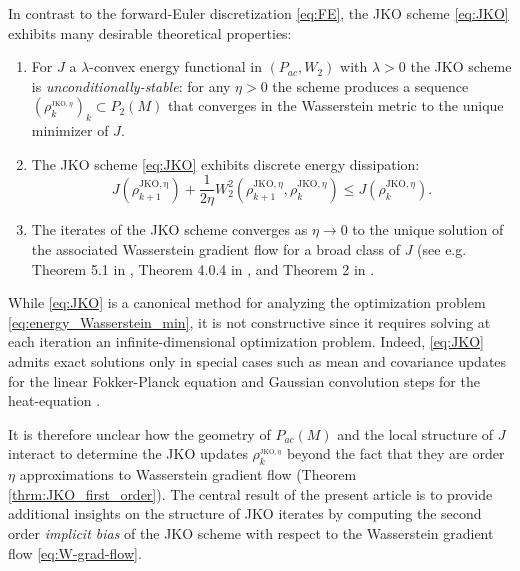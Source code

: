 \documentclass[reqno,11pt,letterpaper]{amsart}
\theoremstyle{plain}
\theoremstyle{definition}
\theoremstyle{remark}
\newcommand{\gives}{\rightarrow}
\begin{document}
In contrast to the forward-Euler discretization \eqref{eq:FE}, the JKO scheme \eqref{eq:JKO} exhibits many desirable theoretical properties: 
\begin{enumerate}
    \item For $J$ a $\lambda$-convex energy functional in $(P_{ac},W_{2})$ with $\lambda > 0$ the JKO scheme is \emph{unconditionally-stable}: for any $\eta > 0$ the scheme produces a sequence $(\rho_k^{_{\mathrm{JKO},  \eta}})_k \subset P_{2}(M)$ that converges in the Wasserstein metric to the unique minimizer of $J$. 
    \item The JKO scheme \eqref{eq:JKO} exhibits discrete energy dissipation:
    \[
        J(\rho_{k+1}^{\mathrm{JKO, \eta}}) + \frac{1}{2\eta}W_{2}^{2}(\rho_{k+1}^{\mathrm{JKO}, \eta}, \rho_k^{\mathrm{JKO},\eta}) \leq J(\rho_k^{\mathrm{JKO},\eta}).
    \] 
    \item The iterates of the JKO scheme converges as $\eta \gives 0$ to the unique solution of the associated Wasserstein gradient flow  for a broad class of $J$ (see e.g. Theorem 5.1 in \cite{Jordan1998}, Theorem 4.0.4 in \cite{AGS2008}, and Theorem 2 in \cite{Serfaty2011}. 
\end{enumerate}
While \eqref{eq:JKO} is a canonical method for analyzing the optimization problem \eqref{eq:energy_Wasserstein_min}, it is not constructive since it requires  solving at each iteration an infinite-dimensional optimization problem. Indeed, \eqref{eq:JKO} admits exact solutions only in special cases such as mean and covariance updates for the linear Fokker-Planck equation \cite{Halder2017} and Gaussian convolution steps for the heat-equation \cite{Burger2012, Erbar2010}. 

It is therefore unclear how the geometry of $P_{ac}(M)$ and the local structure of $J$ interact to determine the JKO updates $\rho_k^{_{\mathrm{JKO}, \eta}}$ beyond the fact that they are order $\eta$ approximations to Wasserstein gradient flow (Theorem \ref{thrm:JKO_first_order}). The central result of the present article is to provide additional insights on the structure of JKO iterates by computing the second order \textit{implicit bias} of the JKO scheme with respect to the Wasserstein gradient flow \eqref{eq:W-grad-flow}. 
 


\end{document}
